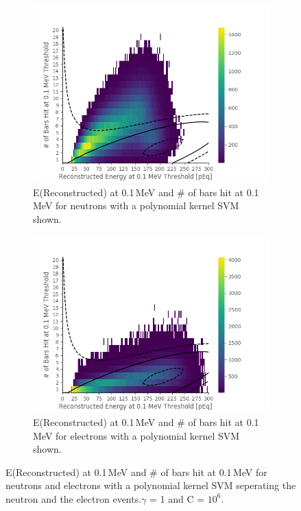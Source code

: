\documentclass[12pt,a4paper]{article}
\begin{document}
\begin{figure}[H]
\centering
\begin{subfigure}{.5\textwidth}
  \centering
  \includegraphics[width=\linewidth]{chosen_svm_neutron_poly.png}
  \captionsetup{width=.9\linewidth}
  \caption{E(Reconstructed) at 0.1\,MeV and \# of bars hit at 0.1\,MeV for neutrons with a polynomial kernel SVM shown.}
  \label{poly_svm_neutron}
\end{subfigure}%
\begin{subfigure}{.5\textwidth}
  \centering
  \includegraphics[width=\linewidth]{chosen_svm_electron_poly.png}
  \captionsetup{width=.9\linewidth}
  \caption{E(Reconstructed) at 0.1\,MeV and \# of bars hit at 0.1\,MeV for electrons with a polynomial kernel SVM shown.}
  \label{poly_svm_electron}
\end{subfigure}
\caption{E(Reconstructed) at 0.1\,MeV and \# of bars hit at 0.1\,MeV for neutrons and electrons with a polynomial kernel SVM seperating the neutron and the electron events.$\gamma$ = 1 and C = $10^6$. }
\label{poly_svm_on_neutrons_and_electrons}
\end{figure}
\end{document}
